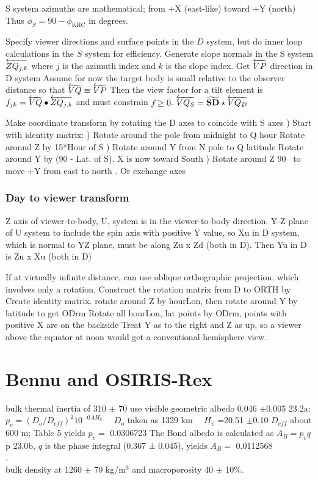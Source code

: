 \documentclass{article}
\begin{document}
S system azimuths are mathematical; from +X (east-like) toward +Y (north)
Thus $\phi_S= 90-\phi_\mathrm{KRC}$ in degrees.

 Specify viewer directions and surface points in the $D$ system, but do inner
 loop calculations in the $S$ system for efficiency. Generate slope normals in
 the S system $\overleftarrow{ZQ_{j,k}}$ where $j$ is the azimuth index and $k$ is the
 slope index.
\qi Get $\overleftarrow{VP}  $ direction in D system
\qii Assume for now the target body is small relative to the observer distance so that $\overleftarrow{VQ} \equiv \overleftarrow{VP}$ 
\qi Then the view factor for a tilt element is  $f_{jk}=\overleftarrow{VQ} \bullet \overleftarrow{ZQ_{j,k}} $ and must constrain  $f \geq 0$.
\qi $\overleftarrow{VQ_S} = \widetilde {\mathbf{ SD }} \star  \overleftarrow{VQ_D}$  

Make  coordinate transform by rotating the D axes to coincide with S axes
) Start with identity matrix: 
) Rotate around the pole from midnight to Q hour \qt Rotate around Z by 15*Hour of S
) Rotate around Y from N pole to Q latitude \qt Rotate around Y by (90 - Lat. of S). X is now toward South
) Rotate around Z 90\qd~ to move +Y from east to north \qt . Or exchange axes

\subsubsection{Day to viewer transform}
Z axis of viewer-to-body, U, system is in the viewer-to-body direction. 
Y-Z plane of U system to include the spin axis with positive Y value, so Xu in D system, which is normal to YZ plane, must be along Zu x Zd (both in D). Then Yu in D is Zu x Xu (both in D)

If at virtually infinite distance, can use oblique orthographic projection, which involves only a rotation.  Construct the rotation matrix from D to ORTH by 
\qi Create identity matrix. rotate around Z by hourLon, then rotate around Y by latitude to get ODrm
\qi Rotate all hourLon, lat points by ODrm, points with positive X are on the backside 
\qi Treat Y as to the right and Z as up, so a viewer above the equator at noon would get a conventional hemisphere view.


\section{Bennu and OSIRIS-Rex}  %

\qi bulk thermal inertia of 310 $\pm$ 70 \quti
\qi use visible geometric albedo  0.046  $\pm$0.005
\qii 23.2a: $p_v = ( D_o/ D_{eff})^2 10^{-0.4H_v}$  \ \ $D_o$ taken as 1329 km \ \ $H_v$ =20.51 $\pm$0.10
\qii $ D_{eff}$ about 600 m; Table 5
\qii yields $p_v=$ 0.0306723
\qi The Bond albedo is calculated as $A_B = p_v q$ 
\qii p 23.0b,  $q$ is the phase integral (0.367 ± 0.045),
\qii yields $A_B =$  0.0112568
\\ .
\\ 
\qi bulk density at 1260 $\pm$ 70 kg/m$^3$ and macroporosity 40 $\pm$ 10\%.
\end{document}
